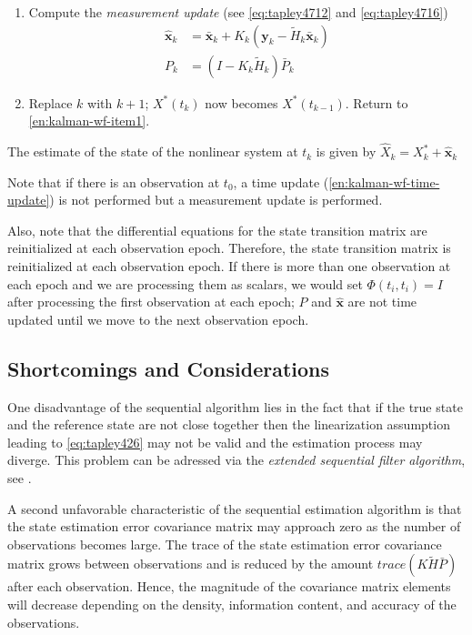 \begin{enumerate}
  \item Compute the \emph{measurement update} (see \ref{eq:tapley4712} and \ref{eq:tapley4716})
    \begin{subequations}
    \begin{align}
\hat{\bm{x}}_k &= \bar{\bm{x}}_k + K_k \left( \bm{y}_k - \tilde{H}_k \bar{\bm{x}}_k \right) \\
P_k &= \left( I - K_k \tilde{H}_k \right) \bar{P}_k
    \end{align}
    \end{subequations}

  \item Replace \(k\) with \(k+1\); \(X^*(t_k)\) now becomes \(X^*(t_{k-1})\).
  Return to \ref{en:kalman-wf-item1}.

\end{enumerate}

The estimate of the state of the nonlinear system at \(t_k\) is given by 
\(\hat{X}_k = X^*_k + \hat{\bm{x}}_k\)

Note that if there is an observation at \(t_0\), a time update (\ref{en:kalman-wf-time-update}) is not performed but a measurement update is performed.

Also, note that the differential equations for the state transition matrix
are reinitialized at each observation epoch. Therefore, the state transition matrix
is reinitialized at each observation epoch. If there is more than one observation
at each epoch and we are processing them as scalars, we would set \(\Phi (t_i , t_i ) = I\)
after processing the first observation at each epoch; \(P\) and \(\hat{\bm{x}}\) are not
time updated until we move to the next observation epoch. 

\subsection{Shortcomings and Considerations}
One disadvantage of the sequential algorithm lies in the fact that if the true state 
and the reference state are not close together then the linearization assumption 
leading to \ref{eq:tapley426} may not be valid and the estimation process may diverge.
This problem can be adressed via the \emph{extended sequential filter algorithm}, see 
\cite{tapley}.

A second unfavorable characteristic of the sequential estimation algorithm is
that the state estimation error covariance matrix may approach zero as the number
of observations becomes large. The trace of the state estimation error covariance 
matrix grows between observations and is reduced by the amount \(trace(K\tilde{H}\bar{P})\) 
after each observation. Hence, the magnitude of the covariance matrix elements 
will decrease depending on the density, information content, and accuracy of the 
observations.

